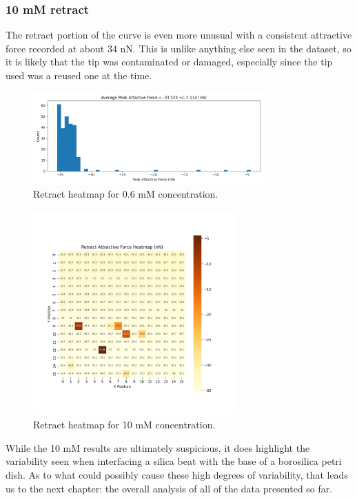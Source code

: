 \newpage 
\subsubsection{10 mM retract}

The retract portion of the curve is even more unusual with a consistent attractive force recorded at about 34 nN. This is unlike anything else seen in the dataset, so it is likely that the tip was contaminated or damaged, especially since the tip used was a reused one at the time.

\begin{figure}[h!!!]
    \centering
    \includegraphics[width=0.79\textwidth]{chapter7/ForceMaps/10mM/contact_force_histogram.png}
    \caption{Retract heatmap for 0.6 mM concentration.}
    \label{fig:contfhist}
\end{figure}

\begin{figure}[h!]
\centering
\includegraphics[width=0.7\textwidth]{chapter7/ForceMaps/10mM/Retract_heatmap.png}
\caption{Retract heatmap for 10 mM concentration.}
\label{fig:pHOverall}
\end{figure}

While the 10 mM results are ultimately suspicious, it does highlight the variability seen when interfacing a silica beat with the base of a borosilica petri dish. As to what could possibly cause these high degrees of variability, that leads us to the next chapter: the overall analysis of all of the data presented so far.
